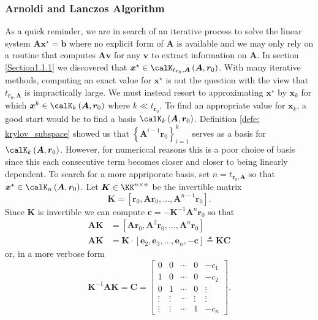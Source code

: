 \subsubsection{Arnoldi and Lanczos Algorithm}\label{Section1.1.3}

As a quick reminder, we are in search of an iterative process to solve the linear system $\bm{A} \bm{x}^{\star} = \bm{b}$ where no explicit form of $\bm{A}$ is available and we may only rely on a routine that computes $\bm{A} \bm{v}$ for any $\bm{v}$ to extract information on $\bm{A}$. In section \ref{Section1.1.1} we discovered that $\bm{x}^{\star} \in \calK_{t_{\bm{r}_0}, \bm{A}} \left( \bm{A}, \bm{r}_0 \right)$. With many iterative methods, computing an exact value for $\bm{x}^{\star}$ is out the question with the view that $t_{\bm{r}_0, \bm{A}}$ is impractically large. We must instead resort to approximating $\bm{x}^{\star}$ by $\bm{x}_k$ for which $\bm{x}^{k} \in \calK_{k} \left( \bm{A}, \bm{r}_0 \right)$ where $k \ll t_{\bm{r}_0}$. To find an appropriate value for $\bm{x}_k$, a good start would be to find a basis $\calK_{k} \left( \bm{A}, \bm{r}_0 \right)$. Definition \ref{defe: krylov_subspace} showed us that $\left\{ \bm{A}^{i-1} \bm{r}_0 \right\}_{i=1}^{k}$ serves as a basis for $\calK_{k} \left( \bm{A}, \bm{r}_0 \right)$. However, for numericcal reasons this is a poor choice of basis since this each consecutive term becomes closer and closer to being linearly dependent. To search for a more appriporate basis, set $n = t_{\bm{r}_0, \bm{A}}$ so that $\bm{x}^{\star} \in \calK_{n} \left( \bm{A}, \bm{r}_0 \right)$. Let $\bm{K} \in \KK^{n \times n}$ be the invertible matrix
\[
    \bm{K} = \left[ \bm{r}_0 , \bm{A} \bm{r}_0, \ldots , \bm{A}^{n-1} \bm{r}_0 \right].
\]
Since $\bm{K}$ is invertible we can compute $\bm{c} = - \bm{K}^{-1} \bm{A}^{n} \bm{r}_0$ so that
\begin{align*}
    \bm{A} \bm{K} & = \left[ \bm{A} \bm{r}_0, \bm{A}^{2} \bm{r}_0, \ldots , \bm{A}^{n} \bm{r}_0 \right]                     \\
    \bm{A} \bm{K} & = \bm{K} \cdot \left[ \bm{e}_2, \bm{e}_3, \ldots , \bm{e}_n, - \bm{c}  \right] \triangleq \bm{K} \bm{C}
\end{align*}
or, in a more verbose form
\[
    \bm{K}^{-1} \bm{A} \bm{K} = \bm{C} =
    \begin{bmatrix}
        0      & 0      & \cdots & 0      & -c_1   \\
        1      & 0      & \cdots & 0      & -c_2   \\
        0      & 1      & \cdots & 0      & \vdots \\
        \vdots & \vdots & \cdots & \vdots & \vdots \\
        \vdots & \vdots & \cdots & 1      & -c_n
    \end{bmatrix}.
\]
